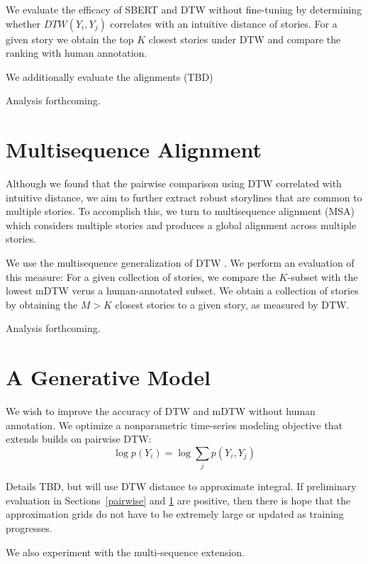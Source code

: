 \documentclass{article}
\begin{document}
We evaluate the efficacy of SBERT and DTW without fine-tuning by determining whether
$DTW(Y_i, Y_j)$ correlates with an intuitive distance of stories.
For a given story we obtain the top $K$ closest stories under DTW
and compare the ranking with human annotation.

We additionally evaluate the alignments (TBD)

Analysis forthcoming.

\section{Multisequence Alignment}
\label{msa}
Although we found that the pairwise comparison using DTW correlated with intuitive distance,
we aim to further extract robust storylines that are common to multiple stories.
To accomplish this, we turn to multisequence alignment (MSA) which
considers multiple stories and produces a global alignment across
multiple stories.

We use the multisequence generalization of DTW \citep{zhou2016gctw}.
We perform an evaluation of this measure:
For a given collection of stories, we compare the $K$-subset with the lowest mDTW
verus a human-annotated subset.
We obtain a collection of stories by obtaining the $M > K$ closest stories to a given story,
as measured by DTW.

Analysis forthcoming.

\section{A Generative Model}
We wish to improve the accuracy of DTW and mDTW without human annotation.
We optimize a nonparametric time-series modeling objective that extends builds on
pairwise DTW:
\begin{equation*}
\log p(Y_i) = \log \sum_j p(Y_i, Y_j)
\end{equation*}

Details TBD, but will use DTW distance to approximate integral.
If preliminary evaluation in Sections~\ref{pairwise} and \ref{msa}
are positive, then there is hope that the approximation
grids do not have to be extremely large or updated as training progresses.

We also experiment with the multi-sequence extension.

\newpage


\end{document}

